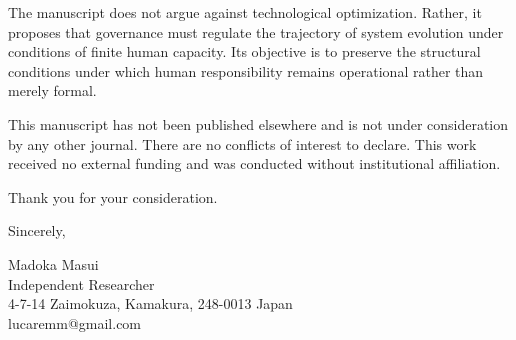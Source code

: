 \documentclass[12pt]{article}
\begin{document}
The manuscript does not argue against technological optimization. Rather, it proposes
that governance must regulate the trajectory of system evolution under conditions of
finite human capacity. Its objective is to preserve the structural conditions under which
human responsibility remains operational rather than merely formal.

This manuscript has not been published elsewhere and is not under consideration by any
other journal. There are no conflicts of interest to declare. This work received no
external funding and was conducted without institutional affiliation.

Thank you for your consideration.

\bigskip
\noindent
Sincerely,

\vspace{1.2cm}
\noindent
Madoka Masui\\
Independent Researcher\\
4-7-14 Zaimokuza, Kamakura, 248-0013 Japan\\
lucaremm@gmail.com
\end{document}
